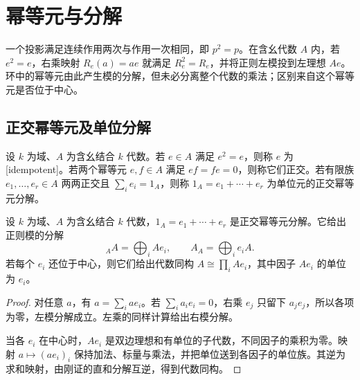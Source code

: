 
\section{幂等元与分解}
\label{b2:sec:1103}

一个投影满足连续作用两次与作用一次相同，即 \(p^2=p\)。在含幺代数 \(A\) 内，若 \(e^2=e\)，右乘映射 \(R_e(a)=ae\) 就满足 \(R_e^2=R_e\)，并将正则左模投到左理想 \(Ae\)。环中的幂等元由此产生模的分解，但未必分离整个代数的乘法；区别来自这个幂等元是否位于中心。

%
%

\subsection{正交幂等元及单位分解}
\label{b2:subsec:1103:01}

\begin{definition}\label{b2:def:orthogonal-idempotents}
	设 \(k\) 为域、\(A\) 为含幺结合 \(k\) 代数。若 \(e\in A\) 满足 \(e^2=e\)，则称 \(e\) 为[idempotent]。若两个幂等元 \(e,f\in A\) 满足 \(ef=fe=0\)，则称它们正交。若有限族 \(e_1,\ldots,e_r\in A\) 两两正交且 \(\sum_i e_i=1_A\)，则称 \(1_A=e_1+\cdots+e_r\) 为单位元的正交幂等元分解。
\end{definition}

\begin{proposition}\label{b2:prop:regular-orthogonal-decomposition}
	设 \(k\) 为域、\(A\) 为含幺结合 \(k\) 代数，\(1_A=e_1+\cdots+e_r\) 是正交幂等元分解。它给出正则模的分解
	\[
		{}_AA=\bigoplus_i Ae_i,\qquad A_A=\bigoplus_i e_iA.
	\]
	若每个 \(e_i\) 还位于中心，则它们给出代数同构 \(A\cong\prod_i Ae_i\)，其中因子 \(Ae_i\) 的单位为 \(e_i\)。
\end{proposition}
\begin{proof}
	对任意 \(a\)，有 \(a=\sum_i ae_i\)。若 \(\sum_i a_i e_i=0\)，右乘 \(e_j\) 只留下 \(a_j e_j\)，所以各项为零，左模分解成立。左乘的同样计算给出右模分解。

	当各 \(e_i\) 在中心时，\(Ae_i\) 是双边理想和有单位的子代数，不同因子的乘积为零。映射 \(a\mapsto(ae_i)_i\) 保持加法、标量与乘法，并把单位送到各因子的单位族。其逆为求和映射，由刚证的直和分解互逆，得到代数同构。
\end{proof}

